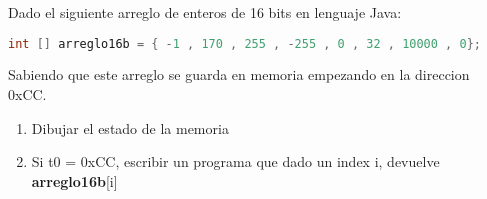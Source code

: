 \begin{enunciado}{\ejercicio}
    Dado el siguiente arreglo de enteros de 16 bits en lenguaje Java:

    \begin{mdframed}[backgroundcolor=light-gray, roundcorner=10pt,leftmargin=1, rightmargin=1, innerleftmargin=15, innertopmargin=1.5,innerbottommargin=1.5, outerlinewidth=1, linecolor=light-gray]
    \begin{lstlisting}[language=Java]
        int [] arreglo16b = { -1 , 170 , 255 , -255 , 0 , 32 , 10000 , 0};
    \end{lstlisting}
    \end{mdframed}

    Sabiendo que este arreglo se guarda en memoria empezando en la direccion 0xCC.

    \begin{enumerate}
        \item Dibujar el estado de la memoria
        \item Si t0 = 0xCC, escribir un programa que dado un index i, devuelve \textbf{arreglo16b}[i]
    \end{enumerate}
    \end{enunciado}


    